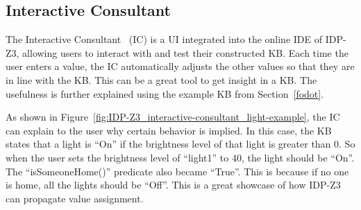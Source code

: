 \documentclass[11pt,a4paper]{report}
\newcommand{\fodot}{FO($\cdot$)\xspace}
\begin{document}

\subsection{Interactive Consultant}
\label{interactive_consultant}
The Interactive Consultant~\cite{InteractiveConsultant} (IC) is a UI integrated into the online IDE of IDP-Z3, allowing users to interact with and test their constructed KB. Each time the user enters a value, the IC automatically adjusts the other values so that they are in line with the KB. This can be a great tool to get insight in a KB. The usefulness is further explained using the example KB from Section~\ref{fodot}.

As shown in Figure~\ref{fig:IDP-Z3_interactive-consultant_light-example}, the IC can explain to the user why certain behavior is implied. In this case, the KB states that a light is ``On'' if the brightness level of that light is greater than 0. So when the user sets the brightness level of ``light1'' to 40, the light should be ``On''. The ``isSomeoneHome()'' predicate also became ``True''. This is because if no one is home, all the lights should be ``Off''. This is a great showcase of how IDP-Z3 can propagate value assignment.
\end{document}
